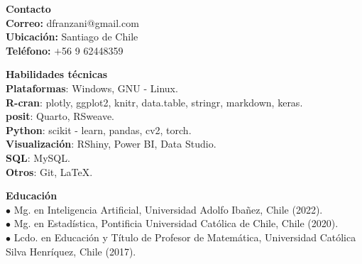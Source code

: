 \documentclass[letterpaper,10pt,spanish]{article}
\begin{document}
\hfill
\begin{minipage}[t]{0.22\textwidth} 
{\normalsize{
\vspace{1cm}
{\color{white}
{\Large{\textbf{Contacto}}}\\ 
\textbf{Correo:} dfranzani@gmail.com\\ 
\textbf{Ubicación:} Santiago de Chile\\ 
\textbf{Teléfono:} $+$56 9 62448359

\vspace{1cm}


{\Large{\textbf{Habilidades técnicas}}}\\ 
\textbf{Plataformas}: Windows, GNU - Linux.\\
\textbf{R-cran}: plotly, ggplot2, knitr, data.table, stringr, markdown, keras.\\
\textbf{posit}: Quarto, RSweave.\\ 
\textbf{Python}: scikit - learn, pandas, cv2, torch.\\
\textbf{Visualización}: RShiny, Power BI, Data Studio.\\
\textbf{SQL}: MySQL.\\
\textbf{Otros}: Git, \LaTeX .\\
\vspace{1cm}

{\Large{\textbf{Educación}}}\\%
$\bullet$ Mg. en Inteligencia Artificial, Universidad Adolfo Ibañez, Chile (2022).\\ %
$\bullet$ Mg. en Estadística, Pontificia Universidad Católica de Chile, Chile (2020).\\%
$\bullet$ Lcdo. en Educación y Título de Profesor de Matemática, Universidad Católica Silva Henríquez, Chile (2017).\\

}}}
\end{minipage}
\end{document}

